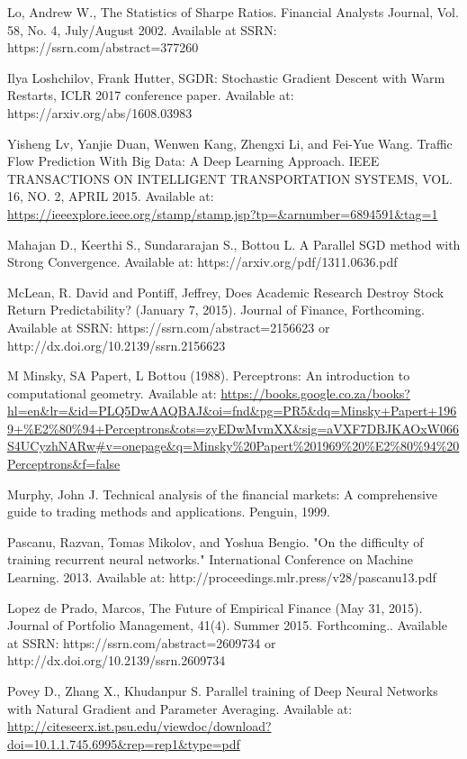 \documentclass[a4paper,latin]{paper}
\begin{document}
\begin{thebibliography}{bibliography}
Lo, Andrew W., The Statistics of Sharpe Ratios. Financial Analysts Journal, Vol. 58, No. 4, July/August 2002. Available at SSRN: https://ssrn.com/abstract=377260

Ilya Loshchilov, Frank Hutter, SGDR: Stochastic Gradient Descent with Warm Restarts, ICLR 2017 conference paper. Available at: https://arxiv.org/abs/1608.03983


Yisheng Lv, Yanjie Duan, Wenwen Kang, Zhengxi Li, and Fei-Yue Wang. Traffic Flow Prediction With Big Data:
A Deep Learning Approach. IEEE TRANSACTIONS ON INTELLIGENT TRANSPORTATION SYSTEMS, VOL. 16, NO. 2, APRIL 
2015. Available at: \url{https://ieeexplore.ieee.org/stamp/stamp.jsp?tp=&arnumber=6894591&tag=1}

Mahajan D., Keerthi S., Sundararajan S., Bottou L. A Parallel SGD method with Strong 
Convergence. Available at: https://arxiv.org/pdf/1311.0636.pdf

McLean, R. David and Pontiff, Jeffrey, Does Academic Research Destroy Stock Return Predictability? (January 7, 2015). Journal of Finance, Forthcoming. Available at SSRN: https://ssrn.com/abstract=2156623 or http://dx.doi.org/10.2139/ssrn.2156623

M Minsky, SA Papert, L Bottou (1988). Perceptrons: An introduction to computational  geometry. Available at: \url{https://books.google.co.za/books?hl=en&lr=&id=PLQ5DwAAQBAJ&oi=fnd&pg=PR5&dq=Minsky+Papert+1969+%E2%80%94+Perceptrons&ots=zyEDwMvmXX&sig=aVXF7DBJKAOxW066S4UCyzhNARw#v=onepage&q=Minsky%20Papert%201969%20%E2%80%94%20Perceptrons&f=false}

Murphy, John J. Technical analysis of the financial markets: A comprehensive guide to trading methods and applications. Penguin, 1999.

Pascanu, Razvan, Tomas Mikolov, and Yoshua Bengio. "On the difficulty of training recurrent neural networks." International Conference on Machine Learning. 2013.
Available at: http://proceedings.mlr.press/v28/pascanu13.pdf

Lopez de Prado, Marcos, The Future of Empirical Finance (May 31, 2015). Journal of Portfolio Management, 41(4). Summer 2015. Forthcoming.. Available at SSRN: https://ssrn.com/abstract=2609734 or http://dx.doi.org/10.2139/ssrn.2609734

Povey D., Zhang X., Khudanpur S. Parallel training of Deep Neural Networks with Natural Gradient and Parameter Averaging. Available at: \url{http://citeseerx.ist.psu.edu/viewdoc/download?doi=10.1.1.745.6995&rep=rep1&type=pdf}


\end{thebibliography}
\end{document}
